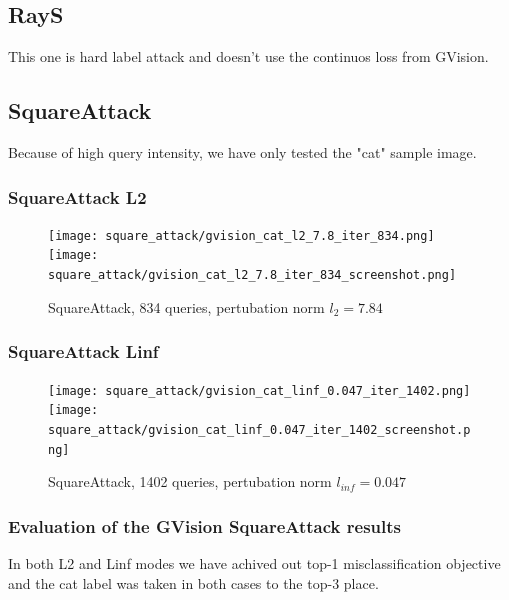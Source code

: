 \subsection{RayS}
This one is hard label attack and doesn't use the continuos loss from GVision.

\subsection{SquareAttack}
Because of high query intensity, we have only tested the "cat" sample image.


\subsubsection{SquareAttack L2}
\begin{figure}[!htb]
\null\hspace{1cm}
  \texttt{[image: square\_attack/gvision\_cat\_l2\_7.8\_iter\_834.png]}
\endminipage
\null\hspace{1cm}
  \texttt{[image: square\_attack/gvision\_cat\_l2\_7.8\_iter\_834\_screenshot.png]}
\endminipage
\caption{SquareAttack, 834 queries, pertubation norm $l_2 = 7.84$ }
\label{fig:square_cat_l2}
\end{figure}

\subsubsection{SquareAttack Linf}

\begin{figure}[!htb]
\null\hspace{1cm}
  \texttt{[image: square\_attack/gvision\_cat\_linf\_0.047\_iter\_1402.png]}
\endminipage
\null\hspace{1cm}
  \texttt{[image: square\_attack/gvision\_cat\_linf\_0.047\_iter\_1402\_screenshot.png]}
\endminipage
\caption{SquareAttack, 1402 queries, pertubation norm $l_{inf} = 0.047$}
\label{fig:square_cat_linf}
\end{figure}

\subsubsection{Evaluation of the GVision SquareAttack results}

In both L2 and Linf modes we have achived out top-1 misclassification objective and the cat label was taken in both cases to the top-3 place.

